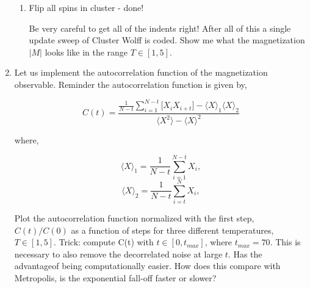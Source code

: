 \documentclass{article}
\begin{document}
\begin{enumerate}
\begin{enumerate}
\item Flip all spins in cluster - done!

Be very careful to get all of the indents right! After all of this a single update sweep of Cluster Wolff is coded. Show me what the magnetization $|M|$ looks like in the range $T\in[1,5]$.
\end{enumerate} 

\item Let us implement the autocorrelation function of the magnetization observable. Reminder the autocorrelation function is given by,

\begin{equation}
	C(t) = \frac{\frac{1}{N-t} \sum_{i=1}^{N-t} \bigg[ X_{i} X_{i+t} \bigg] -\langle X \rangle_1 \langle X \rangle_2}{\langle X^2 \rangle - \langle X \rangle ^2}
\end{equation}

where,

\begin{equation}
\langle X \rangle_1 =  \frac{1}{N-t} \sum_{i=1}^{N-t} X_i ,
\end{equation}
\begin{equation}
\langle X \rangle_2 =  \frac{1}{N-t} \sum_{i=t}^{N} X_{i},
\end{equation}

Plot the autocorrelation function normalized with the first step, $C(t)/C(0)$ as a function of steps for three different temperatures, $T\in[1,5]$. Trick: compute C(t) with $t\in [0,t_{max}]$, where $t_{max}=70$. This is necessary to also remove the decorrelated noise at large $t$. Has the advantageof being computationally easier. How does this compare with Metropolis, is the exponential fall-off faster or slower?

 
\end{enumerate}
\end{document}
